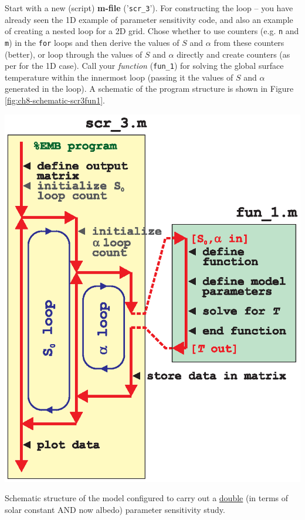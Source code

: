 \documentclass{tufte-book} %
\begin{document}
Start with a new (script) \textbf{m-file} ('\texttt{scr\_3}'). For constructing the loop -- you have already seen the 1D example of parameter sensitivity code, and also an example of creating a nested loop for a 2D grid. Chose whether to use counters (e.g. \texttt{n} and \texttt{m}) in the \texttt{for} loops and then derive the values of  \(S\) and \(\alpha\)
from these counters (better), 
 or loop through the values of  \(S\) and \(\alpha\)
directly and create counters (as per for the 1D case).
 Call your \textit{function} (\texttt{fun\_1}) for solving the global surface temperature within the innermost loop (passing it the values of \(S\) and \(\alpha\) generated in the loop). A schematic of the program structure is shown in Figure \ref{fig:ch8-schematic-scr3fun1}.

\begin{marginfigure}[0.0in]
\includegraphics[width=\linewidth]{ch8-schematic-scr3fun1.eps}
\caption{Schematic structure of the model configured to carry out a \uline{double} (in terms of solar constant AND now albedo) parameter sensitivity study.}
\label{fig:ch8-schematic-scr3fun1}
\end{marginfigure}
\end{document}

